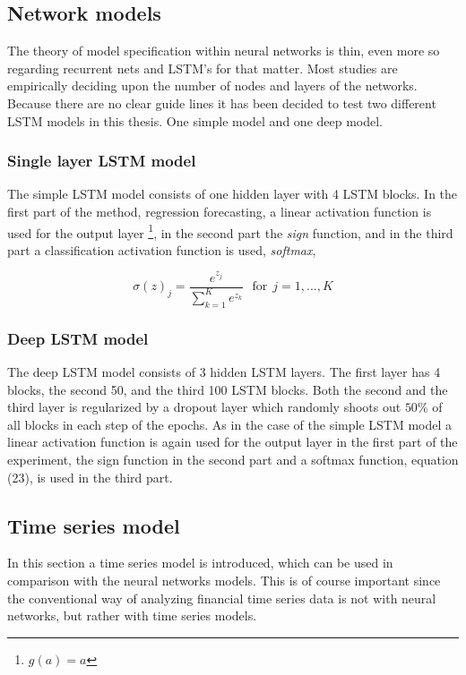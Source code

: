 \documentclass[12pt, letterpaper]{amsart}%
\begin{document}
\subsection{Network models}
The theory of model specification within neural networks is thin, even more so regarding recurrent nets and LSTM's for that matter. Most studies are empirically deciding upon the number of nodes and layers of the networks. Because there are no clear guide lines it has been decided to test two different LSTM models in this thesis. One simple model and one deep model.

\subsubsection{Single layer LSTM model}
The simple LSTM model consists of one hidden layer with 4 LSTM blocks. In the first part of the method, regression forecasting, a linear activation function is used for the output layer \footnote{$g(a) = a$}, in the second part the \textit{sign} function, and in the third part a classification activation function is used, \textit{softmax},

\begin{equation}
\sigma (z)_j = \frac{e^{z_j}}{\sum_{k=1}^K e^{z_k}} \ \ \ \text{for} \ \ j = 1,...,K
\end{equation}

\subsubsection{Deep LSTM model}
The deep LSTM model consists of 3 hidden LSTM layers. The first layer has 4 blocks, the second 50, and the third 100 LSTM blocks. Both the second and the third layer is regularized by a dropout layer which randomly shoots out $50\%$ of all blocks in each step of the epochs. As in the case of the simple LSTM model a linear activation function is again used for the output layer in the first part of the experiment, the sign function in the second part and a softmax function, equation (23), is used in the third part.

\subsection{Time series model}
In this section a time series model is introduced, which can be used in comparison with the neural networks models. This is of course important since the conventional way of analyzing financial time series data is not with neural networks, but rather with time series models.
\\
\end{document}
